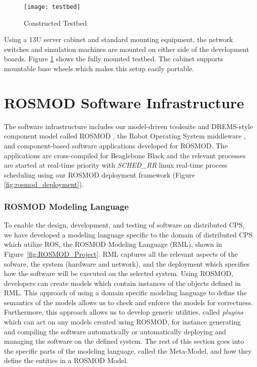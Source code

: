 \begin{figure}[h]
    \centering
    \texttt{[image: testbed]}
    \caption{Constructed Testbed}
    \label{fig:testbed}
\end{figure}

Using a 13U server cabinet and standard mounting equipment, the network switches and simulation machines are mounted on either side of the development boards. Figure \ref{fig:testbed} shows the fully mounted testbed. The cabinet supports mountable base wheels which makes this setup easily portable. 

\section{ROSMOD Software Infrastructure}

The software infrastructure includes our model-driven toolsuite and DREMS-style component model called ROSMOD \cite{kumarROSMOD}, the Robot Operating System middleware \cite{ROS}, and component-based software applications developed for ROSMOD. The applications are cross-compiled for Beaglebone Black and the relevant processes are started at real-time priority with \emph{SCHED\_RR} linux real-time process scheduling using our ROSMOD deployment framework (Figure \ref{fig:rosmod_deployment}).

\subsubsection{ROSMOD Modeling Language}

To enable the design, development, and testing of software on
distributed CPS, we have developed a modeling language specific to the
domain of distributed CPS which utilize ROS, the ROSMOD Modeling
Language (RML), shown in Figure~\ref{fig:ROSMOD_Project}.  RML
captures all the relevant aspects of the sofware, the system (hardware
and network), and the deployment which specifies how the software will
be executed on the selected system.  Using ROSMOD, developers can
create models which contain instances of the objects defined in RML.
This approach of using a domain specific modeling language to define
the semantics of the models allows us to check and enforce the models
for correctness.  Furthermore, this approach allows us to develop
generic utilities, called \emph{plugins} which can act on any models
created using ROSMOD, for instance generating and compiling the software
automatically or automatically deploying and managing the software on
the defined system.  The rest of this section goes into the specific
parts of the modeling language, called the Meta-Model, and how they
define the entities in a ROSMOD Model.

